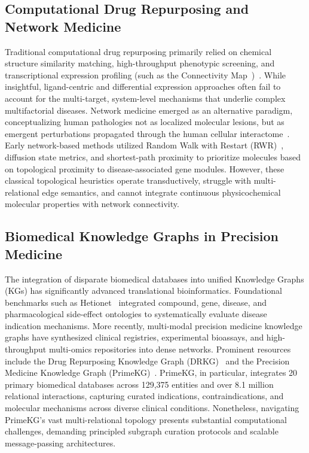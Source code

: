 \documentclass[preprint,12pt]{elsarticle}
\begin{document}
\subsection{Computational Drug Repurposing and Network Medicine}
Traditional computational drug repurposing primarily relied on chemical structure similarity matching, high-throughput phenotypic screening, and transcriptional expression profiling (such as the Connectivity Map~\cite{ref_cmap})~\cite{ref6,ref7}. While insightful, ligand-centric and differential expression approaches often fail to account for the multi-target, system-level mechanisms that underlie complex multifactorial diseases. Network medicine emerged as an alternative paradigm, conceptualizing human pathologies not as localized molecular lesions, but as emergent perturbations propagated through the human cellular interactome~\cite{ref3}. Early network-based methods utilized Random Walk with Restart (RWR)~\cite{ref_rwr}, diffusion state metrics, and shortest-path proximity to prioritize molecules based on topological proximity to disease-associated gene modules. However, these classical topological heuristics operate transductively, struggle with multi-relational edge semantics, and cannot integrate continuous physicochemical molecular properties with network connectivity.

\subsection{Biomedical Knowledge Graphs in Precision Medicine}
The integration of disparate biomedical databases into unified Knowledge Graphs (KGs) has significantly advanced translational bioinformatics. Foundational benchmarks such as Hetionet~\cite{ref_hetio} integrated compound, gene, disease, and pharmacological side-effect ontologies to systematically evaluate disease indication mechanisms. More recently, multi-modal precision medicine knowledge graphs have synthesized clinical registries, experimental bioassays, and high-throughput multi-omics repositories into dense networks. Prominent resources include the Drug Repurposing Knowledge Graph (DRKG)~\cite{ref_drkg} and the Precision Medicine Knowledge Graph (PrimeKG)~\cite{ref29}. PrimeKG, in particular, integrates 20 primary biomedical databases across 129,375 entities and over 8.1 million relational interactions, capturing curated indications, contraindications, and molecular mechanisms across diverse clinical conditions. Nonetheless, navigating PrimeKG's vast multi-relational topology presents substantial computational challenges, demanding principled subgraph curation protocols and scalable message-passing architectures.
\end{document}
